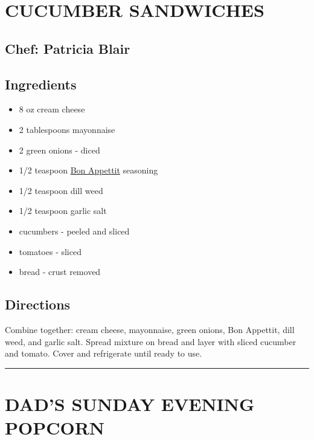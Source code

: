 \documentclass[
]{book}
\providecommand{\tightlist}{%
  \setlength{\itemsep}{0pt}\setlength{\parskip}{0pt}}
\begin{document}
\hypertarget{cucumber-sandwiches}{%
\section*{CUCUMBER SANDWICHES}\label{cucumber-sandwiches}}


\hypertarget{chef-patricia-blair-1}{%
\subsection*{Chef: Patricia Blair}\label{chef-patricia-blair-1}}


\hypertarget{ingredients-3}{%
\subsection*{Ingredients}\label{ingredients-3}}


\begin{itemize}
\tightlist
\item
  8 oz cream cheese
\item
  2 tablespoons mayonnaise
\item
  2 green onions - diced
\item
  1/2 teaspoon \href{https://www.mccormick.com/gourmet/recipes/other/bon-appetit-seasoning-replacement}{Bon Appettit} seasoning
\item
  1/2 teaspoon dill weed
\item
  1/2 teaspoon garlic salt
\item
  cucumbers - peeled and sliced
\item
  tomatoes - sliced
\item
  bread - crust removed
\end{itemize}

\hypertarget{directions-3}{%
\subsection*{Directions}\label{directions-3}}


Combine together: cream cheese, mayonnaise, green onions, Bon Appettit, dill weed, and garlic salt.
Spread mixture on bread and layer with sliced cucumber and tomato. Cover and refrigerate until ready to use.

\begin{center}\rule{0.5\linewidth}{0.5pt}\end{center}

\hypertarget{dads-sunday-evening-popcorn}{%
\section*{DAD'S SUNDAY EVENING POPCORN}\label{dads-sunday-evening-popcorn}}
\end{document}
